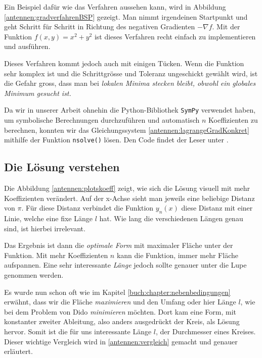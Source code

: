 Ein Beispiel dafür wie das Verfahren aussehen kann, wird in 
Abbildung \ref{antennen:gradverfahrenBSP} gezeigt. Man nimmt irgendeinen Startpunkt
und geht Schritt für Schritt in Richtung des negativen Gradienten $-\nabla f$.
Mit der Funktion $f(x,y)=x^2+y^2$ ist dieses Verfahren recht einfach zu 
implementieren und ausführen.

Dieses Verfahren kommt jedoch auch mit einigen Tücken. Wenn die Funktion sehr komplex ist
und die Schrittgrösse und Toleranz ungeschickt gewählt wird, ist die Gefahr gross, dass man
bei \em lokalen \em Minima stecken bleibt, obwohl ein \em globales \em Minimum gesucht ist.

Da wir in unserer Arbeit ohnehin die Python-Bibliothek \texttt{SymPy} verwendet haben, 
um symbolische Berechnungen durchzuführen und automatisch $n$ Koeffizienten zu berechnen, 
konnten wir das Gleichungssystem \eqref{antennen:lagrangeGradKonkret} mithilfe der Funktion 
\texttt{nsolve()} lösen.
Den Code findet der Leser unter \cite{antennen:codeKoeff}.

\subsection{Die Lösung verstehen\label{antennen:auswertung}}

Die Abbildung \ref{antennen:plotskoeff} zeigt, wie sich die Lösung visuell mit mehr 
Koeffizienten verändert. Auf der x-Achse sieht man jeweils eine beliebige Distanz von \emph{$\pi$}.
Für diese Distanz verbindet die Funktion $y_n(x)$ diese Distanz mit einer Linie, welche eine
fixe Länge $l$ hat. Wie lang die verschiedenen Längen genau sind, ist hierbei irrelevant.

Das Ergebnis ist dann die \emph{optimale Form} mit
maximaler Fläche unter der Funktion. Mit mehr Koeffizienten $n$ kann die Funktion,
immer mehr Fläche aufspannen. Eine sehr interessante \emph{Länge} jedoch sollte
genauer unter die Lupe genommen werden. 

Es wurde nun schon oft wie im Kapitel \ref{buch:chapter:nebenbedingungen}
erwähnt, dass wir die Fläche \emph{maximieren} und den Umfang oder hier Länge $l$, wie 
bei dem Problem von Dido \emph{minimieren} möchten. 
Dort kam eine Form, mit konstanter zweiter Ableitung, also anders ausgedrückt
der Kreis, als Lösung hervor. Somit ist die für uns interessante Länge $l$, der Durchmesser eines Kreises. Dieser wichtige Vergleich wird in \ref{antennen:vergleich} gemacht und genauer erläutert.

